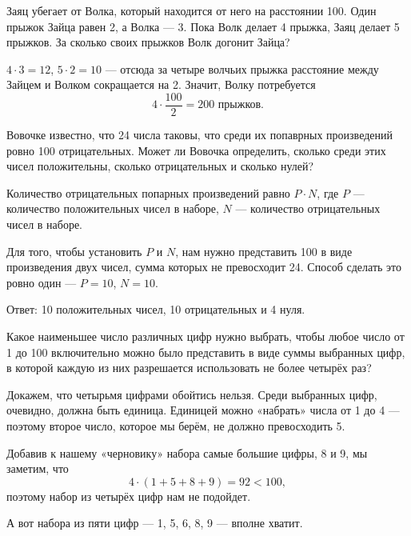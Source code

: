 \documentclass[10pt]{scrbook} \usepackage{modules/nonstahp_book}
\begin{document}
\renewcommand{\theyear}{2015}



\begin{itemize}

	\def\metr#1{\SI{#1}{\text{м}}}
	\itA Заяц убегает от Волка, который находится от него на расстоянии \metr{100}. Один прыжок Зайца равен \metr{2}, а Волка — \metr{3}. Пока Волк делает 4 прыжка, Заяц делает 5 прыжков. За сколько своих прыжков Волк догонит Зайца?
	
	\itr $4 \cdot 3 = 12$, $5 \cdot 2 = 10$ — отсюда за четыре волчьих прыжка расстояние между Зайцем и Волком сокращается на \metr{2}. Значит, Волку потребуется
	$$4 \cdot \frac{100}{2} = 200\text{ прыжков.}$$
	
	\itB Вовочке известно, что 24 числа таковы, что среди их попаврных произведений ровно 100 отрицательных. Может ли Вовочка определить, сколько среди этих чисел положительны, сколько отрицательных и сколько нулей?
	
	\itr Количество отрицательных попарных произведений равно $P \cdot N$, где $P$ — количество положительных чисел в наборе, $N$ — количество отрицательных чисел в наборе.
	
	Для того, чтобы установить $P$ и $N$, нам нужно представить 100 в виде произведения двух чисел, сумма которых не превосходит 24. Способ сделать это ровно один — $P=10$, $N=10$.
	
	Ответ: 10 положительных чисел, 10 отрицательных и 4 нуля.
	
	\itC Какое наименьшее число различных цифр нужно выбрать, чтобы любое число от 1 до 100 включительно можно было представить в виде суммы выбранных цифр, в которой каждую из них разрешается использовать не более четырёх раз?
	
	\itr Докажем, что четырьмя цифрами обойтись нельзя. Среди выбранных цифр, очевидно, должна быть единица. Единицей можно «набрать» числа от 1 до 4 — поэтому второе число, которое мы берём, не должно превосходить 5.
	
	Добавив к нашему «черновику» набора самые большие цифры, 8 и 9, мы заметим, что
	$$4 \cdot (1+5+8+9) = 92 < 100,$$
	поэтому набор из четырёх цифр нам не подойдет.
	
	А вот набора из пяти цифр — 1, 5, 6, 8, 9 — вполне хватит.

\end{itemize}

\end{document}
